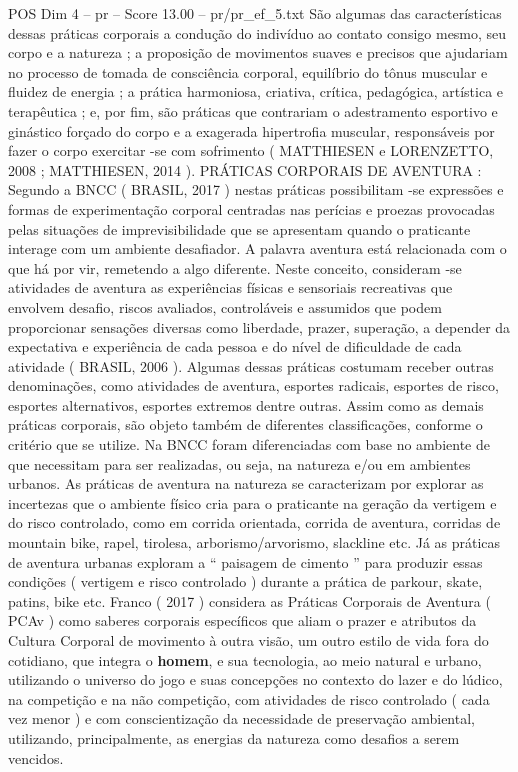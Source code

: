 \begin{textsample}{POS Dim 4 – pr – Score 13.00 – pr/pr\_ef\_5.txt}
São algumas das características dessas práticas corporais a condução do indivíduo ao contato consigo mesmo, seu corpo e a natureza ; a proposição de movimentos suaves e precisos que ajudariam no processo de tomada de consciência corporal, equilíbrio do tônus muscular e fluidez de energia ; a prática harmoniosa, criativa, crítica, pedagógica, artística e terapêutica ; e, por fim, são práticas que contrariam o adestramento esportivo e ginástico forçado do corpo e a exagerada hipertrofia muscular, responsáveis por fazer o corpo exercitar -se com sofrimento ( MATTHIESEN e LORENZETTO, 2008 ; MATTHIESEN, 2014 ).
PRÁTICAS CORPORAIS DE AVENTURA : Segundo a BNCC ( BRASIL, 2017 ) nestas práticas possibilitam -se expressões e formas de experimentação corporal centradas nas perícias e proezas provocadas pelas situações de imprevisibilidade que se apresentam quando o praticante interage com um ambiente desafiador.
A palavra aventura está relacionada com o que há por vir, remetendo a algo diferente.
Neste conceito, consideram -se atividades de aventura as experiências físicas e sensoriais recreativas que envolvem desafio, riscos avaliados, controláveis e assumidos que podem proporcionar sensações diversas como liberdade, prazer, superação, a depender da expectativa e experiência de cada pessoa e do nível de dificuldade de cada atividade ( BRASIL, 2006 ).
Algumas dessas práticas costumam receber outras denominações, como atividades de aventura, esportes radicais, esportes de risco, esportes alternativos, esportes extremos dentre outras.
Assim como as demais práticas corporais, são objeto também de diferentes classificações, conforme o critério que se utilize.
Na BNCC foram diferenciadas com base no ambiente de que necessitam para ser realizadas, ou seja, na natureza e/ou em ambientes urbanos.
As práticas de aventura na natureza se caracterizam por explorar as incertezas que o ambiente físico cria para o praticante na geração da vertigem e do risco controlado, como em corrida orientada, corrida de aventura, corridas de mountain bike, rapel, tirolesa, arborismo/arvorismo, slackline etc.
Já as práticas de aventura urbanas exploram a “ paisagem de cimento ” para produzir essas condições ( vertigem e risco controlado ) durante a prática de parkour, skate, patins, bike etc.
Franco ( 2017 ) considera as Práticas Corporais de Aventura ( PCAv ) como saberes corporais específicos que aliam o prazer e atributos da Cultura Corporal de movimento à outra visão, um outro estilo de vida fora do cotidiano, que integra o \textbf{homem}, e sua tecnologia, ao meio natural e urbano, utilizando o universo do jogo e suas concepções no contexto do lazer e do lúdico, na competição e na não competição, com atividades de risco controlado ( cada vez menor ) e com conscientização da necessidade de preservação ambiental, utilizando, principalmente, as energias da natureza como desafios a serem vencidos.

\end{textsample}
